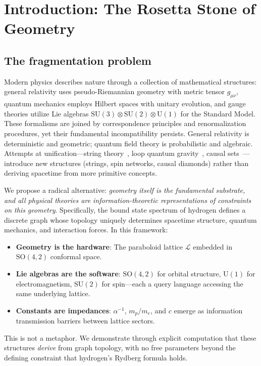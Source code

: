 \documentclass[aps,prd,twocolumn,superscriptaddress,groupedaddress,showpacs]{revtex4-2}
\newcommand{\alphainv}{\ensuremath{\alpha^{-1}}}
\newcommand{\SO}{\ensuremath{\text{SO}}}
\newcommand{\SU}{\ensuremath{\text{SU}}}
\newcommand{\U}{\ensuremath{\text{U}}}
\begin{document}
\section{Introduction: The Rosetta Stone of Geometry}

\subsection{The fragmentation problem}

Modern physics describes nature through a collection of mathematical structures: general relativity uses pseudo-Riemannian geometry with metric tensor $g_{\mu\nu}$, quantum mechanics employs Hilbert spaces with unitary evolution, and gauge theories utilize Lie algebras $\SU(3) \otimes \SU(2) \otimes \U(1)$ for the Standard Model. These formalisms are joined by correspondence principles and renormalization procedures, yet their fundamental incompatibility persists. General relativity is deterministic and geometric; quantum field theory is probabilistic and algebraic. Attempts at unification---string theory~\cite{Polchinski1998}, loop quantum gravity~\cite{Rovelli2004}, causal sets~\cite{Sorkin2005}---introduce new structures (strings, spin networks, causal diamonds) rather than deriving spacetime from more primitive concepts.

We propose a radical alternative: \emph{geometry itself is the fundamental substrate, and all physical theories are information-theoretic representations of constraints on this geometry}. Specifically, the bound state spectrum of hydrogen defines a discrete graph whose topology uniquely determines spacetime structure, quantum mechanics, and interaction forces. In this framework:
\begin{itemize}
\item \textbf{Geometry is the hardware}: The paraboloid lattice $\mathcal{L}$ embedded in $\SO(4,2)$ conformal space.
\item \textbf{Lie algebras are the software}: $\SO(4,2)$ for orbital structure, $\U(1)$ for electromagnetism, $\SU(2)$ for spin---each a query language accessing the same underlying lattice.
\item \textbf{Constants are impedances}: $\alphainv$, $m_p/m_e$, and $c$ emerge as information transmission barriers between lattice sectors.
\end{itemize}

This is not a metaphor. We demonstrate through explicit computation that these structures \emph{derive} from graph topology, with no free parameters beyond the defining constraint that hydrogen's Rydberg formula holds.
\end{document}
